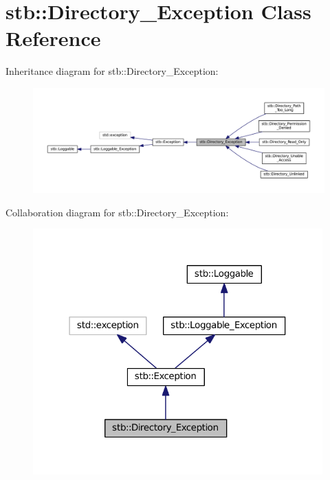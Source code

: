 \hypertarget{classstb_1_1Directory__Exception}{\section{stb\+:\+:Directory\+\_\+\+Exception Class Reference}
\label{classstb_1_1Directory__Exception}
}


Inheritance diagram for stb\+:\+:Directory\+\_\+\+Exception\+:
\nopagebreak
\begin{figure}[H]
\begin{center}
\leavevmode
\includegraphics[width=350pt]{classstb_1_1Directory__Exception__inherit__graph}
\end{center}
\end{figure}


Collaboration diagram for stb\+:\+:Directory\+\_\+\+Exception\+:
\nopagebreak
\begin{figure}[H]
\begin{center}
\leavevmode
\includegraphics[width=316pt]{classstb_1_1Directory__Exception__coll__graph}
\end{center}
\end{figure}
